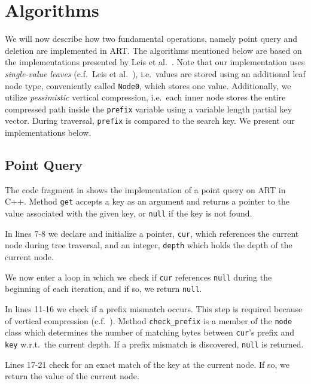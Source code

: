 \documentclass[abstracton,12pt]{scrartcl}
\theoremstyle{definition}
\begin{document}
\section{Algorithms}\label{sec:algorithms}

We will now describe how two fundamental operations, namely
point query and deletion are implemented in ART.
The algorithms mentioned below are based on the implementations presented by
Leis et al.\ \cite{leis2013adaptive}. Note that our implementation uses
\textit{single-value leaves} (c.f.\ Leis et al.\ \cite{leis2013adaptive}), 
i.e.\ values are stored using an additional leaf node type, conveniently
called \texttt{Node0}, which stores one value. Additionally, we utilize
\textit{pessimistic} vertical compression, i.e.\ each inner node stores
the entire compressed path inside the \texttt{prefix} variable using a variable length
partial key vector. During traversal, \texttt{prefix} is compared to the search key.
We present our implementations below.

\subsection{Point Query}\label{sec:point-query}

The code fragment in  shows the implementation of a point query on ART in
C++. Method \texttt{get} accepts a key as an argument and returns a pointer
to the value associated with the given key, or \texttt{null} if the key is not found.

In lines 7-8 we declare and initialize a pointer, \texttt{cur}, which references the
current node during tree traversal, and an integer, \texttt{depth} which holds the depth
of the current node.

We now enter a loop in which we check if \texttt{cur} references \texttt{null}
during the beginning of each iteration, and if so, we return \texttt{null}.

In lines 11-16 we check if a prefix mismatch occurs. This step is required
because of vertical compression (c.f.\ ).
Method \texttt{check\_prefix} is a member of the \texttt{node} class which
determines the number of matching bytes between \texttt{cur}'s prefix
and \texttt{key} w.r.t.\ the current depth. If a prefix mismatch is discovered,
\texttt{null} is returned.

Lines 17-21 check for an exact match of the key at the current node. If so,
we return the value of the current node.
\end{document}
